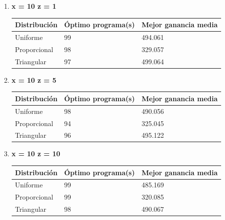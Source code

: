 \documentclass[]{article}
\begin{document}
\begin{enumerate}
	\item \textbf{ x = 10 z = 1}
	\begin{table}[H]
		\begin{center}
			
			\begin{tabular}{|l|l|l|}
				
				\hline
				Distribución & Óptimo programa(s) & Mejor ganancia media\\
				\hline \hline
				Uniforme & 99 & 494.061
				\\ \hline
				Proporcional & 98 & 329.057
				\\ \hline
				Triangular & 97 & 499.064
				\\ \hline
				
			\end{tabular}
			
			\label{tabla:sencilla}
		\end{center}
	\end{table}
	\item \textbf{ x = 10  z = 5}
	\begin{table}[H]
		\begin{center}
			\begin{tabular}{|l|l|l|}
				
				\hline
				Distribución & Óptimo programa(s) & Mejor ganancia media\\
				\hline \hline
				Uniforme & 98 & 490.056
				\\ \hline
				Proporcional & 94 & 325.045
				\\ \hline
				Triangular & 96 & 495.122
				\\ \hline
				
			\end{tabular}
			
			\label{tabla:sencilla}
		\end{center}
	\end{table}
	\item \textbf{ x = 10  z = 10}
	\begin{table}[H]
		\begin{center}
			\begin{tabular}{|l|l|l|}
				
				\hline
				Distribución & Óptimo programa(s) & Mejor ganancia media\\
				\hline \hline
				Uniforme & 99 & 485.169
				\\ \hline
				Proporcional & 99 & 320.085
				\\ \hline
				Triangular & 98 & 490.067
				\\ \hline
				
			\end{tabular}
			
			\label{tabla:sencilla}
		\end{center}
	\end{table}
	
\end{enumerate}
\end{document}
